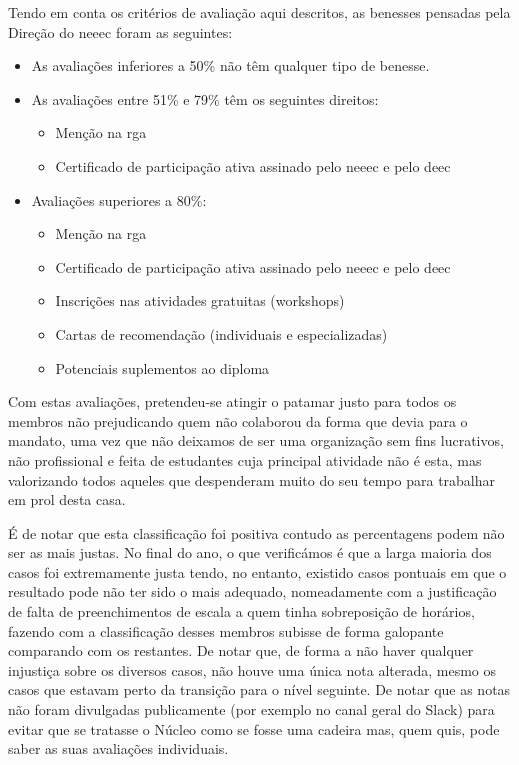 Tendo em conta os critérios de avaliação aqui descritos, as benesses pensadas pela Direção do \acrshort{neeec} foram as seguintes:
\begin{itemize}
	\item As avaliações inferiores a 50\% não têm qualquer tipo de benesse.
	\item As avaliações entre 51\% e 79\% têm os seguintes direitos:
      \begin{itemize}
      \item Menção na \acrshort{rga}
      \item Certificado de participação ativa assinado pelo \acrshort{neeec} e pelo \acrshort{deec}
      \end{itemize}
 	\item Avaliações superiores a 80\%:
      \begin{itemize}
      \item Menção na \acrshort{rga}
      \item Certificado de participação ativa assinado pelo \acrshort{neeec} e pelo \acrshort{deec}
      \item Inscrições nas atividades gratuitas (workshops)
      \item Cartas de recomendação (individuais e especializadas)
      \item Potenciais suplementos ao diploma
      \end{itemize}
\end{itemize}

Com estas avaliações, pretendeu-se atingir o patamar justo para todos os membros não prejudicando quem não colaborou da forma que devia para o mandato, uma vez que não deixamos de ser uma organização sem fins lucrativos, não profissional e feita de estudantes cuja principal atividade não é esta, mas valorizando todos aqueles que despenderam muito do seu tempo para trabalhar em prol desta casa.

É de notar que esta classificação foi positiva contudo as percentagens podem não ser as mais justas. No final do ano, o que verificámos é que a larga maioria dos casos foi extremamente justa tendo, no entanto, existido casos pontuais em que o resultado pode não ter sido o mais adequado, nomeadamente com a justificação de falta de preenchimentos de escala a quem tinha sobreposição de horários, fazendo com a classificação desses membros subisse de forma galopante comparando com os restantes. De notar que, de forma a não haver qualquer injustiça sobre os diversos casos, não houve uma única nota alterada, mesmo os casos que estavam perto da transição para o nível seguinte. De notar que as notas não foram divulgadas publicamente (por exemplo no canal geral do Slack) para evitar que se tratasse o Núcleo como se fosse uma cadeira mas, quem quis, pode saber as suas avaliações individuais.